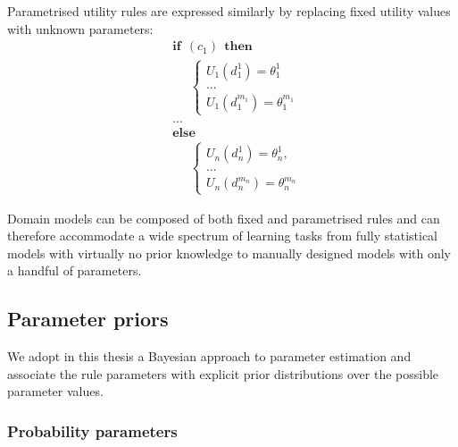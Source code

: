 Parametrised utility rules are expressed similarly by replacing fixed utility values with unknown parameters:
\begin{equation}
\begin{aligned}
& \textbf{if} \ \ (c_{1}) \ \ \textbf{then} \\ 
& \;\;\;\;\; \begin{cases}
U_1(d_1^1) = \theta_1^1 \\
 ... \\
U_1(d_1^{m_1}) = \theta_1^{m_1} 
\end{cases} \\[3mm]
& ...  \\
& \textbf{else} \\
& \;\;\;\;\; \begin{cases}
U_n(d_n^1) = \theta_n^1, \\
... \\
U_n(d_n^{m_n}) = \theta_n^{m_n}
\end{cases}
\end{aligned}
\end{equation}

Domain models can be composed of both fixed and parametrised rules and can therefore accommodate a wide spectrum of learning tasks from fully statistical models with virtually no prior knowledge to manually designed models with only a handful of parameters. 

\subsection{Parameter priors}
\label{sec:rule-params-priors}

We adopt in this thesis a Bayesian approach to parameter estimation and associate the rule parameters with explicit prior distributions over the possible parameter values. 


\subsubsection*{Probability parameters}

